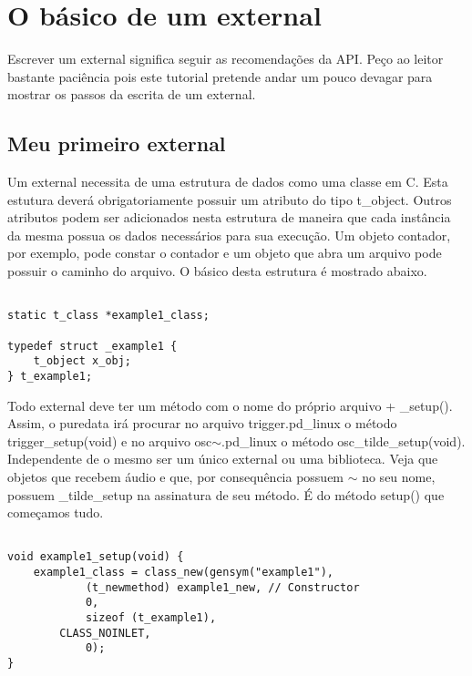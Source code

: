 
\chapter{O básico de um external}

Escrever um external significa seguir as recomendações da API. Peço ao leitor
bastante paciência pois este tutorial pretende andar um pouco devagar para
mostrar os passos da escrita de um external.

\section{Meu primeiro external}

Um external necessita de uma estrutura de dados como uma classe em C. Esta
estutura deverá obrigatoriamente possuir um atributo do tipo t\_object. Outros
atributos podem ser adicionados nesta estrutura de maneira que cada instância
da mesma possua os dados necessários para sua execução. Um objeto contador,
por exemplo, pode constar o contador e um objeto que abra um arquivo pode
possuir o caminho do arquivo. O básico desta estrutura é mostrado abaixo.

\begin{lstlisting}

static t_class *example1_class;

typedef struct _example1 {
    t_object x_obj;
} t_example1;
\end{lstlisting}

Todo external deve ter um método com o nome do próprio arquivo + \_setup().
Assim, o puredata irá procurar no arquivo trigger.pd\_linux o método
trigger\_setup(void) e no arquivo osc$\sim$.pd\_linux o método
osc\_tilde\_setup(void). Independente de o mesmo ser um único external ou uma
biblioteca. Veja que objetos que recebem áudio e que, por consequência possuem
$\sim$ no seu nome, possuem \_tilde\_setup na assinatura de seu método. É do
método setup() que começamos tudo.

\begin{lstlisting}

void example1_setup(void) {
    example1_class = class_new(gensym("example1"),
            (t_newmethod) example1_new, // Constructor
            0,
            sizeof (t_example1),
	    CLASS_NOINLET,
            0);
}
\end{lstlisting}

